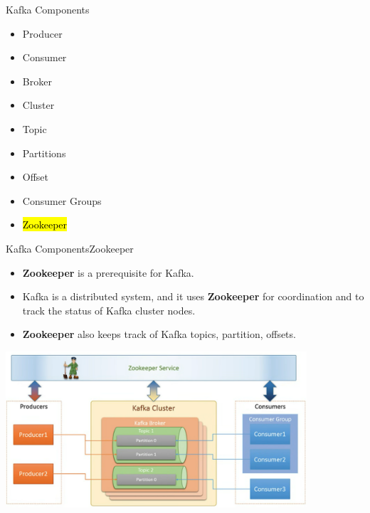 \documentclass{beamer}
\begin{document}
\begin{frame}{Kafka Components}
  \begin{itemize}
    \item Producer
    \item Consumer
    \item Broker
    \item Cluster
    \item Topic
    \item Partitions
    \item Offset
    \item Consumer Groups
    \item \hl{Zookeeper}
  \end{itemize}
\end{frame}

\begin{frame}{Kafka Components}{Zookeeper}
  \begin{itemize}
    \item \textbf{Zookeeper} is a prerequisite for Kafka.
    \item Kafka is a distributed system, and it uses \textbf{Zookeeper} for coordination and to track the status of Kafka cluster nodes.
    \item \textbf{Zookeeper} also keeps track of Kafka topics, partition, offsets.
  \end{itemize}
  \hspace*{2.6em}
  \includegraphics[width=0.84\textwidth]{fig/zookeeper.png}
\end{frame}
\end{document}
